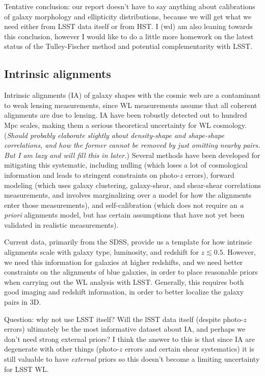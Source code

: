 Tentative conclusion: our report doesn't have to say anything about calibrations of galaxy
morphology and ellipticity distributions, because we will get what we need either from LSST data
itself or from HST. I (wd) am also leaning towards this conclusion, however I would
like to do a little more homework on the latest status of the Tulley-Fischer
method and potential complementarity with LSST.

\subsection{Intrinsic alignments}

Intrinsic alignments (IA) of galaxy shapes with the cosmic web are a contaminant to weak lensing
measurements, since WL measurements assume that all coherent alignments are due to lensing. IA have
been robustly detected out to hundred Mpc scales, making them a serious theoretical uncertainty for
WL cosmology.  ({\em Should probably elaborate slightly about density-shape and shape-shape
  correlations, and how the former cannot be removed by just omitting nearby pairs.  But I am lazy
  and will fill this in later.}) Several methods have been developed for mitigating this systematic,
including nulling (which loses a lot of cosmological information and leads to stringent constraints
on photo-$z$ errors), forward modeling (which uses galaxy clustering, galaxy-shear, and shear-shear
correlations measurements, and involves marginalizing over a model for how the alignments enter
those measurements), and self-calibration (which does not require an {\em a priori} alignments
model, but has certain assumptions that have not yet been validated in realistic measurements).

Current data, primarily from the SDSS, provide us a template for how intrinsic alignments scale with
galaxy type, luminosity, and redshift for $z\lesssim 0.5$.  However, we need this information for
galaxies at higher redshifts, and we need better constraints on the alignments of blue galaxies, in
order to place reasonable priors when carrying out the WL analysis with LSST. Generally, this
requires both good imaging and redshift information, in order to better localize the galaxy pairs in
3D.

Question: why not use LSST itself?  Will the lSST data itself (despite photo-$z$ errors) ultimately
be the most informative dataset about IA, and perhaps we don't need strong external priors?  I think
the answer to this is that since IA are degenerate with other things (photo-$z$ errors and certain
shear systematics) it is still valuable to have {\em external} priors so this doesn't become a
limiting uncertainty for LSST WL.


